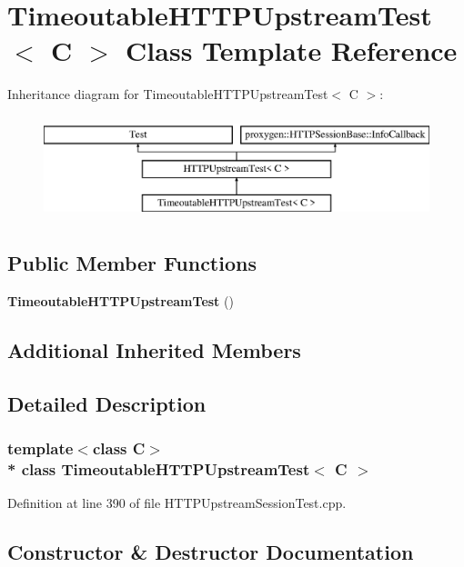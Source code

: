 \section{Timeoutable\+H\+T\+T\+P\+Upstream\+Test$<$ C $>$ Class Template Reference}
\label{classTimeoutableHTTPUpstreamTest}
Inheritance diagram for Timeoutable\+H\+T\+T\+P\+Upstream\+Test$<$ C $>$\+:\begin{figure}[H]
\begin{center}
\leavevmode
\includegraphics[height=3.000000cm]{classTimeoutableHTTPUpstreamTest}
\end{center}
\end{figure}
\subsection*{Public Member Functions}
\begin{DoxyCompactItemize}
\item 
{\bf Timeoutable\+H\+T\+T\+P\+Upstream\+Test} ()
\end{DoxyCompactItemize}
\subsection*{Additional Inherited Members}


\subsection{Detailed Description}
\subsubsection*{template$<$class C$>$\\*
class Timeoutable\+H\+T\+T\+P\+Upstream\+Test$<$ C $>$}



Definition at line 390 of file H\+T\+T\+P\+Upstream\+Session\+Test.\+cpp.



\subsection{Constructor \& Destructor Documentation}
